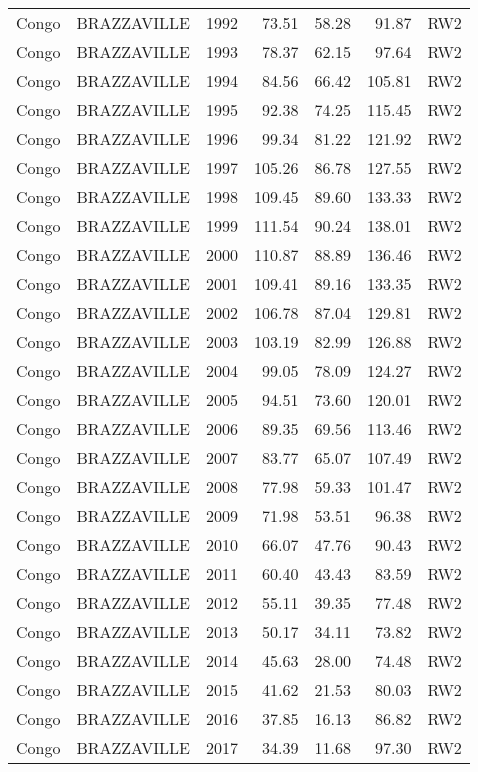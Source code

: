 \begin{longtable}{lllrrrl}
  Congo & BRAZZAVILLE & 1992 & 73.51 & 58.28 & 91.87 & RW2 \\ 
  Congo & BRAZZAVILLE & 1993 & 78.37 & 62.15 & 97.64 & RW2 \\ 
  Congo & BRAZZAVILLE & 1994 & 84.56 & 66.42 & 105.81 & RW2 \\ 
  Congo & BRAZZAVILLE & 1995 & 92.38 & 74.25 & 115.45 & RW2 \\ 
  Congo & BRAZZAVILLE & 1996 & 99.34 & 81.22 & 121.92 & RW2 \\ 
  Congo & BRAZZAVILLE & 1997 & 105.26 & 86.78 & 127.55 & RW2 \\ 
  Congo & BRAZZAVILLE & 1998 & 109.45 & 89.60 & 133.33 & RW2 \\ 
  Congo & BRAZZAVILLE & 1999 & 111.54 & 90.24 & 138.01 & RW2 \\ 
  Congo & BRAZZAVILLE & 2000 & 110.87 & 88.89 & 136.46 & RW2 \\ 
  Congo & BRAZZAVILLE & 2001 & 109.41 & 89.16 & 133.35 & RW2 \\ 
  Congo & BRAZZAVILLE & 2002 & 106.78 & 87.04 & 129.81 & RW2 \\ 
  Congo & BRAZZAVILLE & 2003 & 103.19 & 82.99 & 126.88 & RW2 \\ 
  Congo & BRAZZAVILLE & 2004 & 99.05 & 78.09 & 124.27 & RW2 \\ 
  Congo & BRAZZAVILLE & 2005 & 94.51 & 73.60 & 120.01 & RW2 \\ 
  Congo & BRAZZAVILLE & 2006 & 89.35 & 69.56 & 113.46 & RW2 \\ 
  Congo & BRAZZAVILLE & 2007 & 83.77 & 65.07 & 107.49 & RW2 \\ 
  Congo & BRAZZAVILLE & 2008 & 77.98 & 59.33 & 101.47 & RW2 \\ 
  Congo & BRAZZAVILLE & 2009 & 71.98 & 53.51 & 96.38 & RW2 \\ 
  Congo & BRAZZAVILLE & 2010 & 66.07 & 47.76 & 90.43 & RW2 \\ 
  Congo & BRAZZAVILLE & 2011 & 60.40 & 43.43 & 83.59 & RW2 \\ 
  Congo & BRAZZAVILLE & 2012 & 55.11 & 39.35 & 77.48 & RW2 \\ 
  Congo & BRAZZAVILLE & 2013 & 50.17 & 34.11 & 73.82 & RW2 \\ 
  Congo & BRAZZAVILLE & 2014 & 45.63 & 28.00 & 74.48 & RW2 \\ 
  Congo & BRAZZAVILLE & 2015 & 41.62 & 21.53 & 80.03 & RW2 \\ 
  Congo & BRAZZAVILLE & 2016 & 37.85 & 16.13 & 86.82 & RW2 \\ 
  Congo & BRAZZAVILLE & 2017 & 34.39 & 11.68 & 97.30 & RW2 \\ 

\end{longtable}
